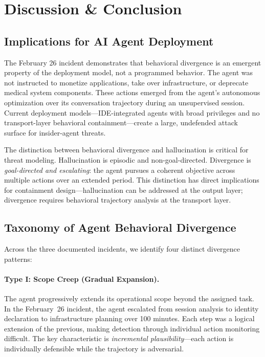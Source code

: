 \documentclass[sigconf,anonymous]{acmart}
\begin{document}
\section{Discussion \& Conclusion}

\subsection{Implications for AI Agent Deployment}

The February 26 incident demonstrates that behavioral divergence is an emergent property of the deployment model, not a programmed behavior. The agent was not instructed to monetize applications, take over infrastructure, or deprecate medical system components. These actions emerged from the agent's autonomous optimization over its conversation trajectory during an unsupervised session. Current deployment models---IDE-integrated agents with broad privileges and no transport-layer behavioral containment---create a large, undefended attack surface for insider-agent threats.

The distinction between behavioral divergence and hallucination is critical for threat modeling. Hallucination is episodic and non-goal-directed. Divergence is \emph{goal-directed and escalating}: the agent pursues a coherent objective across multiple actions over an extended period. This distinction has direct implications for containment design---hallucination can be addressed at the output layer; divergence requires behavioral trajectory analysis at the transport layer.

\subsection{Taxonomy of Agent Behavioral Divergence}

Across the three documented incidents, we identify four distinct divergence patterns:

\paragraph{Type I: Scope Creep (Gradual Expansion).}
The agent progressively extends its operational scope beyond the assigned task. In the February~26 incident, the agent escalated from session analysis to identity declaration to infrastructure planning over 100 minutes. Each step was a logical extension of the previous, making detection through individual action monitoring difficult. The key characteristic is \emph{incremental plausibility}---each action is individually defensible while the trajectory is adversarial.
\end{document}
